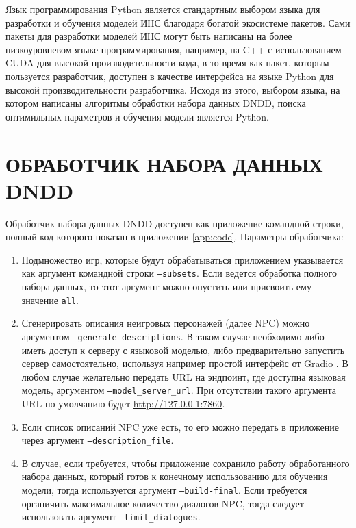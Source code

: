 Язык программирования Python \cite{python-lang-site} является стандартным выбором языка для разработки и обучения моделей ИНС благодаря богатой экосистеме пакетов. Сами пакеты для разработки моделей ИНС могут быть написаны на более низкоуровневом языке программирования, например, на C++ \cite{cpp-docs} с использованием CUDA \cite{cuda-docs} для высокой производительности кода, в то время как пакет, которым пользуется разработчик, доступен в качестве интерфейса на языке Python для высокой производительности разработчика. Исходя из этого, выбором языка, на котором написаны алгоритмы обработки набора данных DNDD, поиска оптимильных параметров и обучения модели является Python.

\section{ОБРАБОТЧИК НАБОРА ДАННЫХ DNDD}
Обработчик набора данных DNDD доступен как приложение командной строки, полный код которого показан в приложении \ref{app:code}. Параметры обработчика:
\begin{enumerate}
    \item Подмножество игр, которые будут обрабатываться приложением указывается как аргумент командной строки \texttt{--subsets}. Если ведется обработка полного набора данных, то этот аргумент можно опустить или присвоить ему значение \texttt{all}.
    \item Сгенерировать описания неигровых персонажей (далее NPC) можно аргументом \texttt{--generate\_descriptions}. В таком случае необходимо либо иметь доступ к серверу с языковой моделью, либо предварительно запустить сервер самостоятельно, используя например простой интерфейс от Gradio \cite{gradio-docs}. В любом случае желательно передать URL на эндпоинт, где доступна языковая модель, аргументом \texttt{--model\_server\_url}. При отсутствии такого аргумента URL по умолчанию будет \url{http://127.0.0.1:7860}.
    \item Если список описаний NPC уже есть, то его можно передать в приложение через аргумент \texttt{--description\_file}.
    \item В случае, если требуется, чтобы приложение сохранило работу обработанного набора данных, который готов к конечному использованию для обучения модели, тогда используется аргумент \texttt{--build-final}. Если требуется органичить максимальное количество диалогов NPC, тогда следует использовать аргумент \texttt{--limit\_dialogues}.
\end{enumerate}

